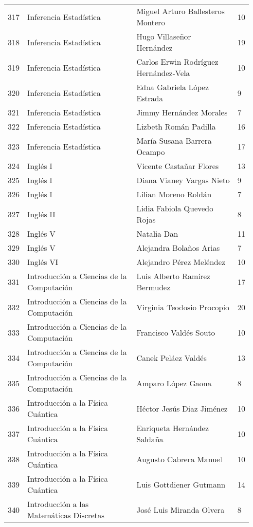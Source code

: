 \begin{table}[ht]
\begin{tabular}{rlll}
  317 & Inferencia Estadística & Miguel Arturo Ballesteros Montero & 10 \\ 
  318 & Inferencia Estadística & Hugo Villaseñor Hernández & 19 \\ 
  319 & Inferencia Estadística & Carlos Erwin Rodríguez Hernández-Vela & 10 \\ 
  320 & Inferencia Estadística & Edna Gabriela López Estrada & 9 \\ 
  321 & Inferencia Estadística & Jimmy Hernández Morales & 7 \\ 
  322 & Inferencia Estadística & Lizbeth Román Padilla & 16 \\ 
  323 & Inferencia Estadística & María Susana Barrera Ocampo & 17 \\ 
  324 & Inglés I & Vicente Castañar Flores & 13 \\ 
  325 & Inglés I & Diana Vianey Vargas Nieto & 9 \\ 
  326 & Inglés I & Lilian Moreno Roldán & 7 \\ 
  327 & Inglés II & Lidia Fabiola Quevedo Rojas & 8 \\ 
  328 & Inglés V & Natalia Dan & 11 \\ 
  329 & Inglés V & Alejandra Bolaños Arias & 7 \\ 
  330 & Inglés VI & Alejandro Pérez Meléndez & 10 \\ 
  331 & Introducción a Ciencias de la Computación & Luis Alberto Ramírez Bermudez & 17 \\ 
  332 & Introducción a Ciencias de la Computación & Virginia Teodosio Procopio & 20 \\ 
  333 & Introducción a Ciencias de la Computación & Francisco Valdés Souto & 10 \\ 
  334 & Introducción a Ciencias de la Computación & Canek Peláez Valdés & 13 \\ 
  335 & Introducción a Ciencias de la Computación & Amparo López Gaona & 8 \\ 
  336 & Introducción a la Física Cuántica & Héctor Jesús Díaz Jiménez & 10 \\ 
  337 & Introducción a la Física Cuántica & Enriqueta Hernández Saldaña & 10 \\ 
  338 & Introducción a la Física Cuántica & Augusto Cabrera Manuel & 10 \\ 
  339 & Introducción a la Física Cuántica & Luis Gottdiener Gutmann & 14 \\ 
  340 & Introducción a las Matemáticas Discretas & José Luis Miranda Olvera & 8 \\ 

\end{tabular}
\end{table}
